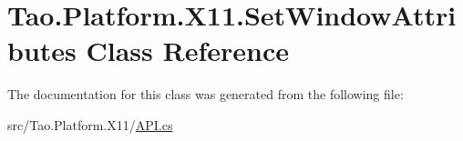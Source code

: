 \hypertarget{class_tao_1_1_platform_1_1_x11_1_1_set_window_attributes}{
\section{Tao.Platform.X11.SetWindowAttributes Class Reference}
\label{class_tao_1_1_platform_1_1_x11_1_1_set_window_attributes}
}


The documentation for this class was generated from the following file:\begin{DoxyCompactItemize}
\item 
src/Tao.Platform.X11/\hyperlink{_a_p_i_8cs}{API.cs}\end{DoxyCompactItemize}
